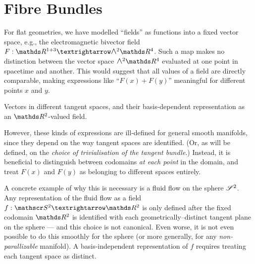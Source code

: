 \section{Fibre Bundles}
\label{cha:fibre-bundles}


For flat geometries, we have modelled ``fields'' as functions into a fixed vector space, e.g., the electromagnetic bivector field $F : \RR^{1+3} → \EA[2]{\RR^4}$.
Such a map makes no distinction between the vector space $\EA[2]{\RR^4}$ evaluated at one point in spacetime and another.
This would suggest that all values of a field are directly comparable, making expressions like ``$F(x) + F(y)$'' meaningful for different points $x$ and $y$.
\begin{marginfigure}
	\caption{
		Vectors in different tangent spaces, and their basis-dependent representation as an $\RR^2$-valued field.
	}
	\label{fig:ball}
\end{marginfigure}
However, these kinds of expressions are ill-defined for general smooth manifolds, since they depend on the way tangent spaces are identified.
(Or, as will be defined, on the \emph{choice of trivialisation of the tangent bundle}.)
Instead, it is beneficial to distinguish between codomains \emph{at each point} in the domain, and treat $F(x)$ and $F(y)$ as belonging to different spaces entirely.


A concrete example of why this is necessary is a fluid flow on the sphere $\mathscr{S}^2$.
Any representation of the fluid flow as a field $f : \Sphere^2 → \RR^2$ is only defined after the fixed codomain $\RR^2$ is identified with each geometrically--distinct tangent plane on the sphere --- and this choice is not canonical.
Even worse, it is not even possible to do this smoothly for the sphere (or more generally, for any \emph{non-parallizable} manifold).
A basis-independent representation of $f$ requires treating each tangent space as distinct.

